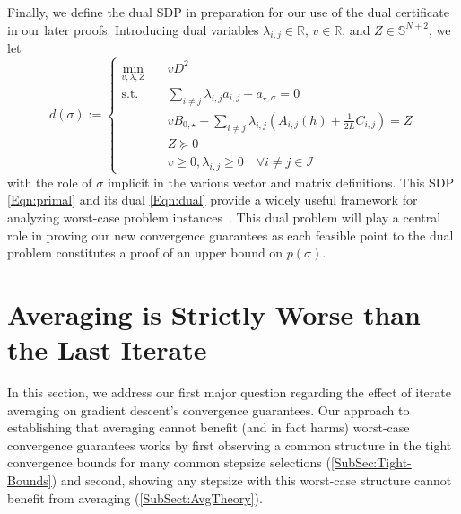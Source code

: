 \documentclass[11pt]{article}
\numberwithin{equation}{section}
\newcommand{\R}{\mathbb{R}}
\theoremstyle{definition}
\theoremstyle{definition}
\theoremstyle{definition}
\newcommand{\1}{\mathbf{1}}
\newcommand{\idxSpecial}{\sigma}
\begin{document}
Finally, we define the dual SDP in preparation for our use of the dual certificate in our later proofs. Introducing dual variables $\lambda_{i,j} \in \R$, $v \in \R$, and $Z \in \mathbb{S}^{N+2}$, we let
\begin{equation} \label{Eqn:dual}
    d(\sigma) := \left\{\begin{array}{lll}
        \min_{v,\lambda,Z} \quad  & v D^2 \\
        \text{s.t. } & \sum_{i\neq j} \lambda_{i,j} a_{i,j} - a_{\star,\idxSpecial} = 0 \\
        & v B_{0,\star} + \sum_{i\neq j} \lambda_{i,j} (A_{i,j}(h) + \frac{1}{2L}C_{i,j}) = Z  \\
        & Z \succeq 0 \\
        & v \geq 0, \lambda_{i,j} \geq 0  \quad \forall i\neq j \in \mathcal{I}
    \end{array}\right.
\end{equation}
with the role of $\sigma$ implicit in the various vector and matrix definitions.
This SDP \eqref{Eqn:primal} and its dual \eqref{Eqn:dual} provide a widely useful framework for analyzing worst-case problem instances~\cite{altschuler2018greed,BnB,FirstPEP,Grimmer_LongStep,Grimmer_Accel,Interpolation}. This dual problem will play a central role in proving our new convergence guarantees as each feasible point to the dual problem constitutes a proof of an upper bound on $p(\sigma)$.

\section{Averaging is Strictly Worse than the Last Iterate}\label{Sect:Averaging}

In this section, we address our first major question regarding the effect of iterate averaging on gradient descent's convergence guarantees. Our approach to establishing that averaging cannot benefit (and in fact harms) worst-case convergence guarantees works by first observing a common structure in the tight convergence bounds for many common stepsize selections (\cref{SubSec:Tight-Bounds}) and second, showing any stepsize with this worst-case structure cannot benefit from averaging (\cref{SubSect:AvgTheory}).
\end{document}
